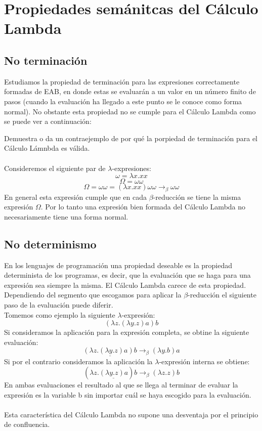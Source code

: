         \section{Propiedades semánitcas del Cálculo Lambda}

                \subsection{No terminación}
                    Estudiamos la propiedad de terminación para las expresiones correctamente formadas de \textsf{EAB}, en donde estas se evaluarán a un valor en un número finito de pasos (cuando la evaluación ha llegado a este punto se le conoce como forma normal). 
                    No obstante esta propiedad no se cumple para el Cálculo Lambda como se puede ver a continuación:
                    \begin{exercise}
                        Demuestra o da un contraejemplo de por qué la porpiedad de terminación para el Cálculo Lámnbda es válida.\\\\
                        Consideremos el siguiente par de $\lambda$-expresiones:\\
                        $$ \omega = \lambda x.xx$$
                        $$ \Omega = \omega \omega$$
                        $$ \Omega = \omega \omega = (\lambda x.xx) \omega \omega \rightarrow_\beta \omega \omega$$
                        En general esta expresión cumple que en cada $\beta$-reducción se tiene la misma expresión $\Omega$.
                        Por lo tanto una expresión bien formada del Cálculo Lambda no necesariamente tiene una forma normal.
                    \end{exercise}

                \subsection{No determinismo}
                    En los lenguajes de programación una propiedad deseable es la propiedad determinista de los programas, es decir, que la evaluación que se haga para una expresión sea siempre la misma. El Cálculo Lambda carece de esta propiedad. Dependiendo del segmento que escogamos para aplicar la $\beta$-reducción el siguiente paso de la evaluación puede diferir.\\
		   Tomemos como ejemplo la siguiente $\lambda$-expresión:
                    $$(\lambda z.(\lambda y.z)a)b$$
                    Si consideramos la aplicación para la expresión completa, se obtine la siguiente evaluación: $$\underline{(\lambda z.(\lambda y.z)a)b} \rightarrow_\beta (\lambda y.b)a$$
                    Si por el contrario consideramos la aplicación la $\lambda$-expresión interna se obtiene: $$(\lambda z.\underline{(\lambda y.z)a})b \rightarrow_\beta (\lambda z.z)b$$
                    En ambas evaluaciones el resultado al que se llega al terminar de evaluar la expresión es la variable b sin importar cuál se haya escogido para la evaluación.\\\\
                    Esta característica del Cálculo Lambda no supone una desventaja por el principio de confluencia.

